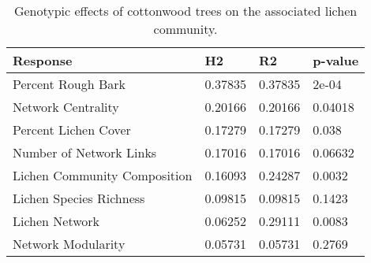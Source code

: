 \begin{table}[ht]
\centering
\begin{tabular}{llll}
  \hline
Response & H2 & R2 & p-value \\ 
  \hline
Percent Rough Bark & 0.37835 & 0.37835 & 2e-04 \\ 
  Network Centrality & 0.20166 & 0.20166 & 0.04018 \\ 
  Percent Lichen Cover & 0.17279 & 0.17279 & 0.038 \\ 
  Number of Network Links & 0.17016 & 0.17016 & 0.06632 \\ 
  Lichen Community Composition & 0.16093 & 0.24287 & 0.0032 \\ 
  Lichen Species Richness & 0.09815 & 0.09815 & 0.1423 \\ 
  Lichen Network & 0.06252 & 0.29111 & 0.0083 \\ 
  Network Modularity & 0.05731 & 0.05731 & 0.2769 \\ 
   \hline
\end{tabular}
\caption{Genotypic effects of cottonwood trees on the associated lichen community.} 
\label{tab:h2_table}
\end{table}
